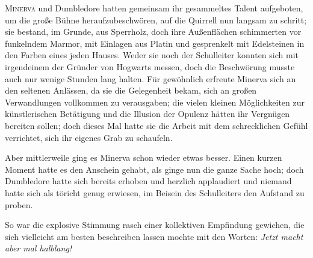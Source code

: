 
\lettrine{M}{inerva} und Dumbledore hatten gemeinsam ihr gesammeltes Talent aufgeboten, um die große Bühne heraufzubeschwören, auf die Quirrell nun langsam zu schritt; sie bestand, im Grunde, aus Sperrholz, doch ihre Außenflächen schimmerten vor funkelndem Marmor, mit Einlagen aus Platin und gesprenkelt mit Edelsteinen in den Farben eines jeden Hauses. Weder sie noch der Schulleiter konnten sich mit irgendeinem der Gründer von Hogwarts messen, doch die Beschwörung musste auch nur wenige Stunden lang halten. Für gewöhnlich erfreute Minerva sich an den seltenen Anlässen, da sie die Gelegenheit bekam, sich an großen Verwandlungen vollkommen zu verausgaben; die vielen kleinen Möglichkeiten zur künstlerischen Betätigung und die Illusion der Opulenz hätten ihr Vergnügen bereiten sollen; doch dieses Mal hatte sie die Arbeit mit dem schrecklichen Gefühl verrichtet, sich ihr eigenes Grab zu schaufeln.

Aber mittlerweile ging es Minerva schon wieder etwas besser. Einen kurzen Moment hatte es den Anschein gehabt, als ginge nun die ganze Sache hoch; doch Dumbledore hatte sich bereits erhoben und herzlich applaudiert und niemand hatte sich als töricht genug erwiesen, im Beisein des Schulleiters den Aufstand zu proben.

So war die explosive Stimmung rasch einer kollektiven Empfindung gewichen, die sich vielleicht am besten beschreiben lassen mochte mit den Worten: \emph{Jetzt macht aber mal halblang!}

